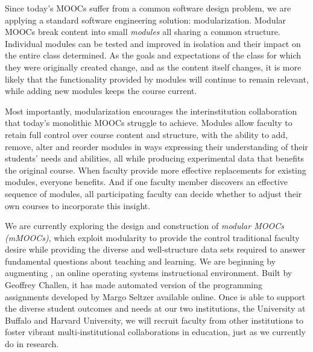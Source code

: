 Since today's MOOCs suffer from a common software design problem, we are
applying a standard software engineering solution: modularization. Modular
MOOCs break content into small \textit{modules} all sharing a common
structure. Individual modules can be tested and improved in isolation and
their impact on the entire class determined. As the goals and expectations of
the class for which they were originally created change, and as the content
itself changes, it is more likely that the functionality provided by modules
will continue to remain relevant, while adding new modules keeps the course
current.

Most importantly, modularization encourages the interinstitution
collaboration that today's monolithic MOOCs struggle to achieve. Modules
allow faculty to retain full control over course content and structure, with
the ability to add, remove, alter and reorder modules in ways expressing
their understanding of their students' needs and abilities, all while
producing experimental data that benefits the original course. When faculty
provide more effective replacements for existing modules, everyone benefits.
And if one faculty member discovers an effective sequence of modules, all
participating faculty can decide whether to adjust their own courses to
incorporate this insight.

We are currently exploring the design and construction of \textit{modular
MOOCs (mMOOCs)}, which exploit modularity to provide the control traditional
faculty desire while providing the diverse and well-structure data sets
required to answer fundamental questions about teaching and learning. We are
beginning by augmenting \opsclass{}, an online operating systems
instructional environment. Built by Geoffrey Challen, it has made automated
version of the programming assignments developed by Margo Seltzer available
online. Once \opsclass{} is able to support the diverse student outcomes and
needs at our two institutions, the University at Buffalo and Harvard
University, we will recruit faculty from other institutions to foster vibrant
multi-institutional collaborations in education, just as we currently do in
research.


